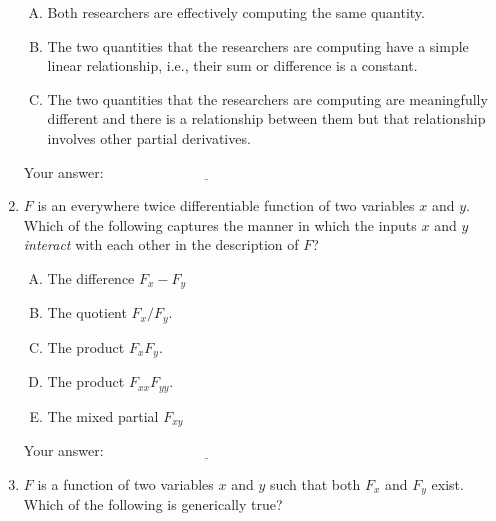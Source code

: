 \documentclass[10pt]{amsart}
\begin{document}
\begin{enumerate}
  \begin{enumerate}[(A)]
  \item Both researchers are effectively computing the same quantity.
  \item The two quantities that the researchers are computing have a
    simple linear relationship, i.e., their sum or difference is a
    constant.
  \item The two quantities that the researchers are computing are
    meaningfully different and there is a relationship between them
    but that relationship involves other partial derivatives.
  \end{enumerate}

  \vspace{0.05in}
  Your answer: $\underline{\qquad\qquad\qquad\qquad\qquad\qquad\qquad}$
  \vspace{0.05in}

\item $F$ is an everywhere twice differentiable function of two
  variables $x$ and $y$. Which of the following captures the manner in
  which the inputs $x$ and $y$ {\em interact} with each other in the
  description of $F$?

  \begin{enumerate}[(A)]
  \item The difference $F_x - F_y$
  \item The quotient $F_x/F_y$.
  \item The product $F_xF_y$.
  \item The product $F_{xx}F_{yy}$.
  \item The mixed partial $F_{xy}$
  \end{enumerate}

  \vspace{0.05in}
  Your answer: $\underline{\qquad\qquad\qquad\qquad\qquad\qquad\qquad}$
  \vspace{0.05in}

\item $F$ is a function of two variables $x$ and $y$ such that both
  $F_x$ and $F_y$ exist. Which of the following is generically true?


\end{enumerate}
\end{document}
